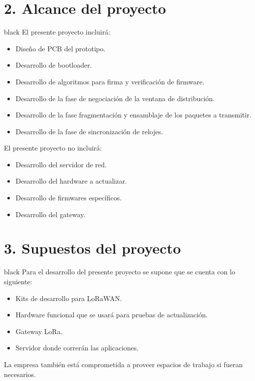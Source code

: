 \documentclass[11pt]{charter}
\begin{document}
\section{2. Alcance del proyecto}
\label{sec:alcance}

\begin{consigna}{black}
El presente proyecto incluirá:
\begin{itemize}
	\item Diseño de PCB del prototipo.
	\item Desarrollo de bootloader.
	\item Desarrollo de algoritmos para firma y verificación de firmware.
	\item Desarrollo de la fase de negociación de la ventana de distribución.
	\item Desarrollo de la fase fragmentación y ensamblaje de los paquetes a transmitir.
	\item Desarrollo de la fase de sincronización de relojes.
\end{itemize}

El presente proyecto no incluirá:
\begin{itemize}
	\item Desarrollo del servidor de red.
	\item Desarrollo del hardware a actualizar.
	\item Desarrollo de firmwares específicos.
	\item Desarrollo del gateway.
\end{itemize}

\end{consigna}


\section{3. Supuestos del proyecto}
\label{sec:supuestos}

\begin{consigna}{black}
Para el desarrollo del presente proyecto se supone que se cuenta con lo siguiente:

\begin{itemize}
\item Kits de desarrollo para LoRaWAN.
\item Hardware funcional que se usará para pruebas de actualización.
\item Gateway LoRa.
\item Servidor donde correrán las aplicaciones.
\end{itemize}

La empresa también está comprometida a proveer espacios de trabajo si fueran necesarios.
\end{consigna}
\end{document}
